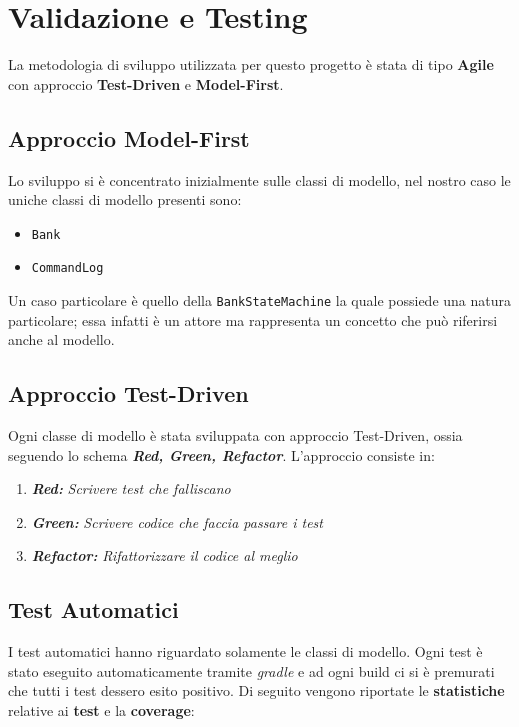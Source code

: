 \section{Validazione e Testing}
\label{Testing}
La metodologia di sviluppo utilizzata per questo progetto è stata di tipo \textbf{Agile} con approccio \textbf{Test-Driven} e \textbf{Model-First}.
  
  \subsection{Approccio Model-First}
  Lo sviluppo si è concentrato inizialmente sulle classi di modello, nel nostro caso le uniche classi di modello presenti sono: 
  \begin{itemize}
    \item \texttt{Bank}
    \item \texttt{CommandLog}
  \end{itemize}
  Un caso particolare è quello della \texttt{BankStateMachine} la quale possiede una natura particolare; essa infatti è un attore ma rappresenta un concetto che può riferirsi anche al modello.
  
  \subsection{Approccio Test-Driven}
  Ogni classe di modello è stata sviluppata con approccio Test-Driven, ossia seguendo lo schema \textbf{\textit{Red, Green, Refactor}}. L'approccio consiste in:
  \begin{enumerate}
    \item{\emph{\textbf{Red:}}}
    \emph{Scrivere test che falliscano}
    \item{\emph{\textbf{Green:}}}
    \emph{Scrivere codice che faccia passare i test}
    \item{\emph{\textbf{Refactor:}}}
    \emph{Rifattorizzare il codice al meglio}
  \end{enumerate}

  \subsection{Test Automatici}
  I test automatici hanno riguardato solamente le classi di modello. Ogni test è stato eseguito automaticamente tramite \textit{gradle} e ad ogni build ci si è premurati che tutti i test dessero esito positivo. Di seguito vengono riportate le \textbf{statistiche} relative ai \textbf{test} e la \textbf{coverage}:

